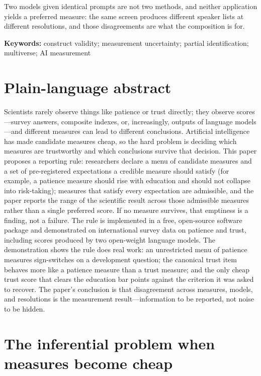 \documentclass[10pt,letterpaper]{article}
\begin{document}
Two models given identical prompts are not two methods, and neither application yields a preferred measure: the same screen produces different speaker lists at different resolutions, and those disagreements are what the composition is for.

\noindent\textbf{Keywords:}
construct validity; measurement uncertainty; partial identification; multiverse; AI measurement

\section*{Plain-language abstract}
Scientists rarely observe things like patience or trust directly; they observe scores---survey answers, composite indexes, or, increasingly, outputs of language models---and different measures can lead to different conclusions.
Artificial intelligence has made candidate measures cheap, so the hard problem is deciding which measures are trustworthy and which conclusions survive that decision.
This paper proposes a reporting rule: researchers declare a menu of candidate measures and a set of pre-registered expectations a credible measure should satisfy (for example, a patience measure should rise with education and should not collapse into risk-taking); measures that satisfy every expectation are admissible, and the paper reports the range of the scientific result across those admissible measures rather than a single preferred score.
If no measure survives, that emptiness is a finding, not a failure.
The rule is implemented in a free, open-source software package and demonstrated on international survey data on patience and trust, including scores produced by two open-weight language models.
The demonstration shows the rule does real work: an unrestricted menu of patience measures sign-switches on a development question; the canonical trust item behaves more like a patience measure than a trust measure; and the only cheap trust score that clears the education bar points against the criterion it was asked to recover.
The paper's conclusion is that disagreement across measures, models, and resolutions is the measurement result---information to be reported, not noise to be hidden.

\section{The inferential problem when measures become cheap}
\label{sec:problem}
\end{document}

